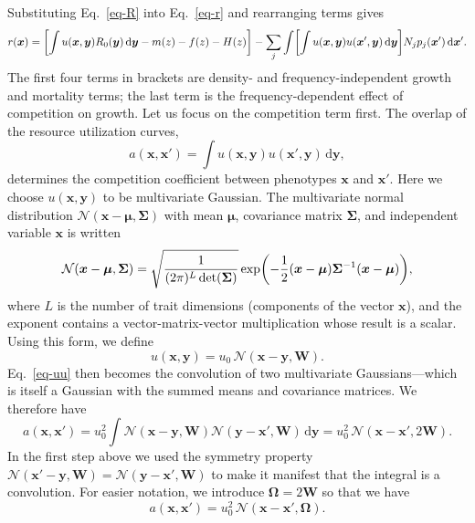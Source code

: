 \documentclass[9pt,twoside,lineno]{pnas-new}
\newcommand{\ud}{\text{d}}
\let\originalleft\left
\let\originalright\right
\renewcommand{\left}{\mathopen{}\mathclose\bgroup\originalleft}
\renewcommand{\right}{\aftergroup\egroup\originalright}
\newcommand{\mat}[1]{\bm{#1}}
\begin{document}
Substituting Eq.~\ref{eq-R} into Eq.~\ref{eq-r} and rearranging terms gives
\begin{equation}
  \label{eq-r-u}
  r(\mat{x})
  = \left[ \int u(\mat{x}, \mat{y}) R_0(\mat{y}) \,\ud\mat{y}
  - m(z)
  - f(z)
  - H(z) \right]
  - \sum_j \int \left[ \int u(\mat{x}, \mat{y})
  u(\mat{x}', \mat{y}) \,\ud\mat{y} \right]
  N_j p_j(\mat{x}') \,\ud\mat{x}'.
\end{equation}
The first four terms in brackets are density- and frequency-independent growth and mortality terms; the last term is the frequency-dependent effect of competition on growth. Let us focus on the competition term first. The overlap of the resource utilization curves,
\begin{equation}
  \label{eq-uu}
  a(\mat{x}, \mat{x}')
  = \int u(\mat{x}, \mat{y}) u(\mat{x}', \mat{y}) \,\ud\mat{y},
\end{equation}
determines the competition coefficient between phenotypes $\mat{x}$ and $\mat{x}'$. Here we choose $u(\mat{x}, \mat{y})$ to be multivariate Gaussian. The multivariate normal distribution $\mathcal{N}(\mat{x} - \mat{\mu}, \mat{\Sigma})$ with mean $\mat{\mu}$, covariance matrix $\mat{\Sigma}$, and independent variable $\mat{x}$ is written
\begin{equation}
  \label{eq-multinorm}
  \mathcal{N}(\mat{x} - \mat{\mu}, \mat{\Sigma})
  = \sqrt{\frac{1}{(2\pi)^L \det(\mat{\Sigma})}}
  \exp \left( -\frac{1}{2}
  (\mat{x}-\mat{\mu}) \mat{\Sigma}^{-1} (\mat{x}-\mat{\mu})
  \right) ,
\end{equation}
where $L$ is the number of trait dimensions (components of the vector $\mat{x}$), and the exponent contains a vector-matrix-vector multiplication whose result is a scalar. Using this form, we define
\begin{equation}
  \label{eq-u}
  u(\mat{x}, \mat{y})
  = u_0 \, \mathcal{N}(\mat{x} - \mat{y}, \mat{W}) .
\end{equation}
Eq.~\ref{eq-uu} then becomes the convolution of two multivariate Gaussians---which is itself a Gaussian with the summed means and covariance matrices. We therefore have
\begin{equation}
  \label{eq-a-calc}
  a(\mat{x}, \mat{x}')
  = u_0^2 \int \mathcal{N}(\mat{x} - \mat{y}, \mat{W})
  \mathcal{N}(\mat{y} - \mat{x}', \mat{W}) \,\ud\mat{y}
  = u_0^2 \, \mathcal{N}(\mat{x} - \mat{x}', 2\mat{W}) .
\end{equation}
In the first step above we used the symmetry property $\mathcal{N}(\mat{x}' - \mat{y}, \mat{W}) = \mathcal{N}(\mat{y} - \mat{x}', \mat{W})$ to make it manifest that the integral is a convolution. For easier notation, we introduce $\mat{\Omega} = 2\mat{W}$ so that we have
\begin{equation}
  \label{eq-a}
  a(\mat{x}, \mat{x}')
  = u_0^2 \, \mathcal{N}(\mat{x} - \mat{x}', \mat{\Omega}) .
\end{equation}
\end{document}
